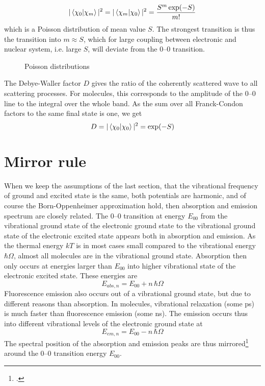 \begin{equation}
 | \braket{ \chi_0 | \chi_m } | ^2  =  | \braket{ \chi_m | \chi_0 } | ^2 = \frac{S^m \exp(-S)}{m!}
\end{equation}
which is a Poisson distribution of mean value $S$.  The strongest transition is thus the transition into $m \approx S$, which for large coupling between electronic and nuclear system, i.e. large $S$, will deviate from the 0--0 transition.

\begin{figure}
   
  \caption{Poisson distributions}
\end{figure}

The Debye-Waller factor $D$ gives the ratio of the coherently scattered wave to all scattering processes. For molecules, this corresponds to the amplitude of the 0--0 line to the integral over the whole band. As the sum over all Franck-Condon factors to the same final state is one, we get
\begin{equation}
 D =  | \braket{ \chi_0 | \chi_0 } | ^2 = \exp(-S)
\end{equation}


\section{Mirror rule}


When we keep the assumptions of the last section, that the vibrational frequency of ground and excited state is the same, both potentials are harmonic, and of course the Born-Oppenheimer approximation hold, then absorption and emission spectrum are closely related. The 0--0 transition at energy $E_{00}$ from the vibrational ground state of the electronic ground state to the vibrational ground state of the electronic excited state appears both in absorption and emission. As the thermal energy $kT$ is in most cases small compared to the vibrational energy $\hbar \Omega$, almost all molecules are in the vibrational ground state. Absorption then only occurs at energies larger than $E_{00}$ into higher vibrational state of the electronic excited state. These energies are
\begin{equation}
  E_{abs, n} = E_{00} + n \, \hbar \Omega
\end{equation}
Fluorescence emission also occurs out of a vibrational ground state, but due to different reasons than absorption. In molecules, vibrational relaxation  (some ps) is much faster than fluorescence emission (some ns). The emission occurs thus into different vibrational levels of the electronic ground state at
\begin{equation}
  E_{em, n} = E_{00} - n \, \hbar \Omega
\end{equation}
The spectral position of the absorption and emission peaks are thus mirrored\footcite[chapter 1.3.2 and 1.3.3]{Lakowicz2010} around the 0--0 transition  energy $E_{00}$.


